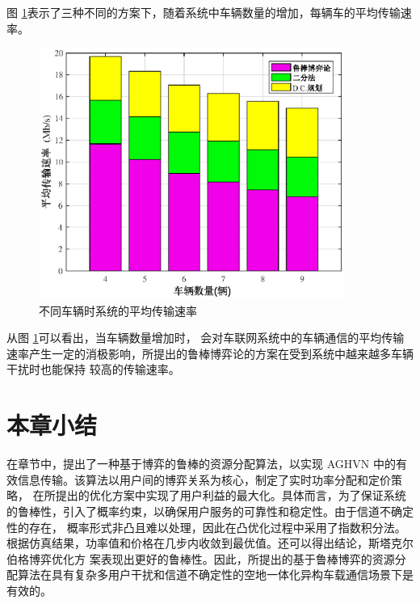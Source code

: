 图 \ref{不同车辆}表示了三种不同的方案下，随着系统中车辆数量的增加，每辆车的平均传输速率。
\begin{figure}[H]
\centering
\includegraphics[width=10cm]{figures//chap2//不同车辆.eps}
\caption{不同车辆时系统的平均传输速率}
\label{不同车辆}
\end{figure}

从图 \ref{不同车辆}可以看出，当车辆数量增加时，
会对车联网系统中的车辆通信的平均传输速率产生一定的消极影响，所提出的鲁棒博弈论的方案在受到系统中越来越多车辆干扰时也能保持
较高的传输速率。%
\section{本章小结}\label{section2-5}
在章节中，提出了一种基于博弈的鲁棒的资源分配算法，以实现 AGHVN 中的有效信息传输。该算法以用户间的博弈关系为核心，制定了实时功率分配和定价策略，
在所提出的优化方案中实现了用户利益的最大化。具体而言，为了保证系统的鲁棒性，引入了概率约束，以确保用户服务的可靠性和稳定性。由于信道不确定性的存在，
概率形式非凸且难以处理，因此在凸优化过程中采用了指数积分法。根据仿真结果，功率值和价格在几步内收敛到最优值。还可以得出结论，斯塔克尔伯格博弈优化方
案表现出更好的鲁棒性。因此，所提出的基于鲁棒博弈的资源分配算法在具有复杂多用户干扰和信道不确定性的空地一体化异构车载通信场景下是有效的。
























